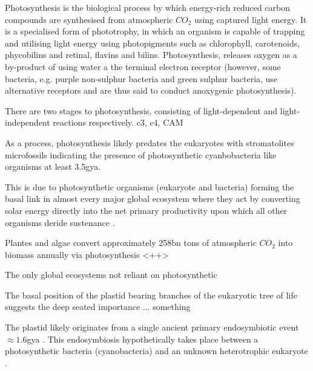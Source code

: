 Photosynthesis is the biological process by which energy-rich reduced carbon compounds 
are synthesised from atmospheric \(CO_{2}\) using captured light energy. 
It is a specialised form of phototrophy, in which an organism is capable of trapping
and utilising light energy using photopigments such as chlorophyll, carotenoids, phycobilins
and retinal, flavins and bilins. 
Photosynthesis, releases oxygen as a by-product of using water a the terminal electron receptor 
(however, some bacteria, e.g. purple non-sulphur bacteria and green sulphur bacteria, use alternative
receptors and are thus said to conduct anoxygenic photosynthesis).

There are two stages to photosynthesis, consisting of light-dependent and light-independent reactions respectively.
c3, c4, CAM


As a process, photosynthesis likely predates the eukaryotes with stromatolites microfossils 
indicating the presence of photosynthetic cyanbobacteria like organisms at least 3.5gya.













This is due to photosynthetic organisms (eukaryote and bacteria) forming the basal 
link in almost every major global ecosystem where they act by converting solar energy 
directly into the net primary productivity upon which all other organisms 
deride sustenance \citep{Reyes-Prieto2007}.



Plantes and algae convert approximately 258bn tons of atmospheric \(CO_{2}\) into biomass
annually via photosynthesis \citep{}<++>




The only global ecosystems not reliant on photosynthetic 




The basal position of the plastid bearing branches of the eukaryotic tree of life %
suggests the deep seated importance ... something \citep{Yoon2004}


The plastid likely originates from a single ancient primary endosymbiotic event \(\approx 1.6\)gya \citep{Yoon2004}.
This endosymbiosis hypothetically takes place between a photosynthetic bacteria (cyanobacteria) and
an unknown heterotrophic eukaryote \citep{Reyes-Prieto2007}.


